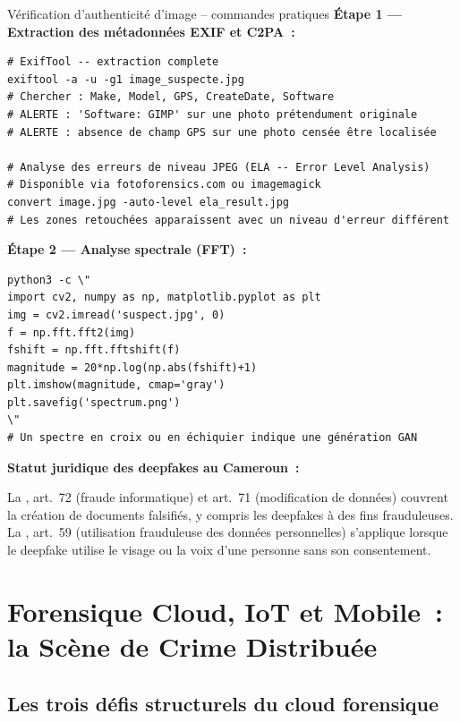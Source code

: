 \begin{boxartefact}{Vérification d'authenticité d'image -- commandes pratiques}
\textbf{Étape 1 --- Extraction des métadonnées EXIF et C2PA~:}
\begin{lstlisting}[language=bash_forensique]
# ExifTool -- extraction complete
exiftool -a -u -g1 image_suspecte.jpg
# Chercher : Make, Model, GPS, CreateDate, Software
# ALERTE : 'Software: GIMP' sur une photo prétendument originale
# ALERTE : absence de champ GPS sur une photo censée être localisée

# Analyse des erreurs de niveau JPEG (ELA -- Error Level Analysis)
# Disponible via fotoforensics.com ou imagemagick
convert image.jpg -auto-level ela_result.jpg
# Les zones retouchées apparaissent avec un niveau d'erreur différent
\end{lstlisting}

\textbf{Étape 2 --- Analyse spectrale (FFT)~:}
\begin{lstlisting}[language=bash_forensique]
python3 -c \"
import cv2, numpy as np, matplotlib.pyplot as plt
img = cv2.imread('suspect.jpg', 0)
f = np.fft.fft2(img)
fshift = np.fft.fftshift(f)
magnitude = 20*np.log(np.abs(fshift)+1)
plt.imshow(magnitude, cmap='gray')
plt.savefig('spectrum.png')
\"
# Un spectre en croix ou en échiquier indique une génération GAN
\end{lstlisting}
\end{boxartefact}

\begin{boxjuris}
\textbf{Statut juridique des deepfakes au Cameroun~:}

La , art.~72 (fraude informatique) et art.~71
(modification de données) couvrent la création de documents falsifiés,
y compris les deepfakes à des fins frauduleuses. La ,
art.~59 (utilisation frauduleuse des données personnelles) s'applique
lorsque le deepfake utilise le visage ou la voix d'une personne sans
son consentement.
\end{boxjuris}

\section{Forensique Cloud, IoT et Mobile~: la Scène de Crime Distribuée}
\label{sec:cloud-iot-mobile}

\subsection{Les trois défis structurels du cloud forensique}

